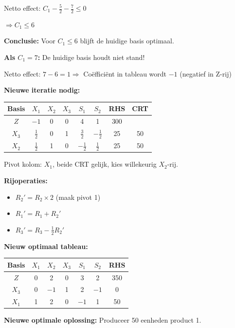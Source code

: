 \documentclass[a4paper,11pt]{article}
\begin{document}
\begin{oefenblok}[title=Productie Optimalisatie bij een Bedrijf]
Netto effect: $C_1 - \frac{5}{2} - \frac{7}{2} \leq 0$

$\Rightarrow C_1 \leq 6$

\textbf{Conclusie:} Voor $C_1 \leq 6$ blijft de huidige basis optimaal.

\textbf{Als $C_1 = 7$:} De huidige basis houdt niet stand!

Netto effect: $7 - 6 = 1 \Rightarrow$ Coëfficiënt in tableau wordt $-1$ (negatief in Z-rij)

\textbf{Nieuwe iteratie nodig:}

\begin{center}
\begin{tabular}{c|ccccc|c|c}
\hline
Basis & $X_1$ & $X_2$ & $X_3$ & $S_1$ & $S_2$ & RHS & CRT \\
\hline
$Z$ & $-1$ & 0 & 0 & 4 & 1 & 300 & \\
$X_3$ & $\frac{1}{2}$ & 0 & 1 & $\frac{3}{2}$ & $-\frac{1}{2}$ & 25 & 50 \\
$X_2$ & $\frac{1}{2}$ & 1 & 0 & $-\frac{1}{2}$ & $\frac{1}{2}$ & 25 & 50 \\
\hline
\end{tabular}
\end{center}

Pivot kolom: $X_1$, beide CRT gelijk, kies willekeurig $X_2$-rij.

\textbf{Rijoperaties:}
\begin{itemize}
    \item $R_2' = R_2 \times 2$ (maak pivot 1)
    \item $R_1' = R_1 + R_2'$
    \item $R_3' = R_3 - \frac{1}{2}R_2'$
\end{itemize}

\textbf{Nieuw optimaal tableau:}

\begin{center}
\begin{tabular}{c|ccccc|c}
\hline
Basis & $X_1$ & $X_2$ & $X_3$ & $S_1$ & $S_2$ & RHS \\
\hline
$Z$ & 0 & 2 & 0 & 3 & 2 & 350 \\
$X_3$ & 0 & $-1$ & 1 & 2 & $-1$ & 0 \\
$X_1$ & 1 & 2 & 0 & $-1$ & 1 & 50 \\
\hline
\end{tabular}
\end{center}

\textbf{Nieuwe optimale oplossing:} Produceer 50 eenheden product 1.


\end{oefenblok}
\end{document}

